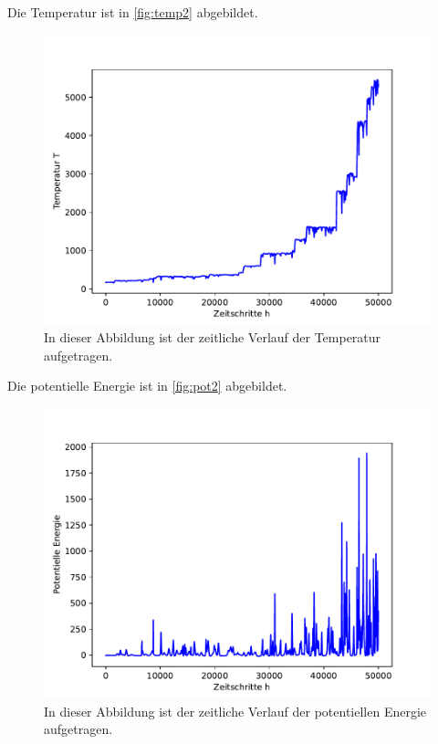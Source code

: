 Die Temperatur ist in \autoref{fig:temp2} abgebildet.
\begin{figure}[H]
    \centering
    \includegraphics[scale=0.5]{MolDyn/Big Boy/temperature.pdf}
    \caption{In dieser Abbildung ist der zeitliche Verlauf der Temperatur aufgetragen.}
    \label{fig:temp2}
\end{figure}
\newpage
Die potentielle Energie ist in \autoref{fig:pot2} abgebildet.
\begin{figure}[H]
    \centering
    \includegraphics[scale=0.5]{MolDyn/Big Boy/potential_energy.pdf}
    \caption{In dieser Abbildung ist der zeitliche Verlauf der potentiellen Energie aufgetragen.}
    \label{fig:pot2}
\end{figure}
